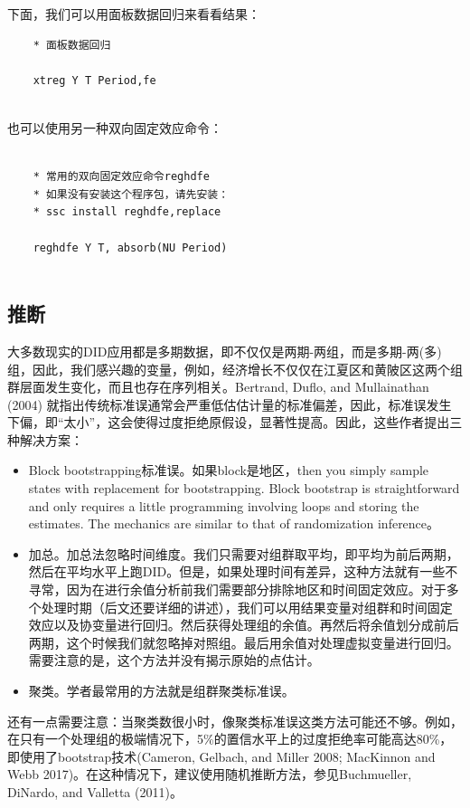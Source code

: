 \documentclass[cn,12pt,math=newtx,citestyle=gb7714-2015,bibstyle=gb7714-2015]{elegantbook}
\begin{document}
下面，我们可以用面板数据回归来看看结果：

	\begin{lstlisting}
	* 面板数据回归
	
	xtreg Y T Period,fe
	
\end{lstlisting}

也可以使用另一种双向固定效应命令：

\begin{lstlisting}
	
	* 常用的双向固定效应命令reghdfe
	* 如果没有安装这个程序包，请先安装：
	* ssc install reghdfe,replace
	
	reghdfe Y T, absorb(NU Period)
	
\end{lstlisting}

\subsection{推断}

大多数现实的DID应用都是多期数据，即不仅仅是两期-两组，而是多期-两(多)组，因此，我们感兴趣的变量，例如，经济增长不仅仅在江夏区和黄陂区这两个组群层面发生变化，而且也存在序列相关。Bertrand, Duflo, and Mullainathan (2004) 就指出传统标准误通常会严重低估估计量的标准偏差，因此，标准误发生下偏，即“太小”，这会使得过度拒绝原假设，显著性提高。因此，这些作者提出三种解决方案：

\begin{itemize}
	\item[1] Block bootstrapping标准误。如果block是地区，then you simply sample states with replacement for bootstrapping. Block bootstrap is straightforward and only requires a little programming involving loops and storing the estimates. The mechanics are similar to that of randomization inference。
	\item[2] 加总。加总法忽略时间维度。我们只需要对组群取平均，即平均为前后两期，然后在平均水平上跑DID。但是，如果处理时间有差异，这种方法就有一些不寻常，因为在进行余值分析前我们需要部分排除地区和时间固定效应。对于多个处理时期（后文还要详细的讲述），我们可以用结果变量对组群和时间固定效应以及协变量进行回归。然后获得处理组的余值。再然后将余值划分成前后两期，这个时候我们就忽略掉对照组。最后用余值对处理虚拟变量进行回归。需要注意的是，这个方法并没有揭示原始的点估计。
	\item[3] 聚类。学者最常用的方法就是组群聚类标准误。
\end{itemize}

还有一点需要注意：当聚类数很小时，像聚类标准误这类方法可能还不够。例如，在只有一个处理组的极端情况下，5\%的置信水平上的过度拒绝率可能高达80\%，即使用了bootstrap技术(Cameron, Gelbach, and Miller 2008; MacKinnon and Webb 2017)。在这种情况下，建议使用随机推断方法，参见Buchmueller, DiNardo, and Valletta (2011)。
\end{document}
